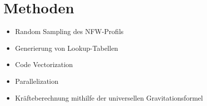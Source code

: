 \section*{Methoden}

\begin{itemize}
  \item Random Sampling des NFW-Profils
  \item Generierung von Lookup-Tabellen
  \item Code Vectorization
  \item Parallelization
  \item Kräfteberechnung mithilfe der universellen Gravitationsformel
\end{itemize}
